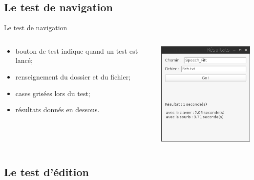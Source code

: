 \documentclass{beamer}
\begin{document}
		\subsection{Le test de navigation}
		
\begin{frame}{Le test de navigation}

	\begin{columns}[c]
	
	\begin{column}{5cm}
	\begin{itemize}
		\item bouton de test indique quand un test est lancé;
		\item renseignement du dossier et du fichier;
		\item cases grisées lors du test;
		\item résultats donnés en dessous.
	\end{itemize}
  	\end{column}
	\begin{column}{5cm}
		\includegraphics[width=5cm]{test_finished}\\
  	\end{column}

	\end{columns}

\end{frame}

		\subsection{Le test d'édition}
		
\end{document}

